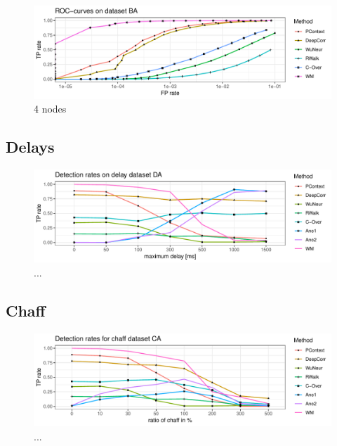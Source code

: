 \documentclass[conference]{IEEEtran}\usepackage[]{graphicx}\usepackage[]{color}
\makeatletter
\def\maxwidth{ %
  \ifdim\Gin@nat@width>\linewidth
    \linewidth
  \else
    \Gin@nat@width
  \fi
}
\newenvironment{knitrout}{}{} %
\makeatother
\begin{document}
\begin{knitrout}
\color{fgcolor}\begin{figure}
\includegraphics[width=\maxwidth]{figure/Noevasion_4nodes-1} \caption[4 nodes]{4 nodes}\label{fig:Noevasion_4nodes}
\end{figure}


\end{knitrout}

\subsection{Delays}

\begin{knitrout}
\color{fgcolor}\begin{figure}
\includegraphics[width=\maxwidth]{figure/Delaydetection-1} \caption[..]{...}\label{fig:Delaydetection}
\end{figure}


\end{knitrout}


\subsection{Chaff}

\begin{knitrout}
\color{fgcolor}\begin{figure}
\includegraphics[width=\maxwidth]{figure/Chaffdetection-1} \caption[..]{...}\label{fig:Chaffdetection}
\end{figure}


\end{knitrout}
\end{document}

